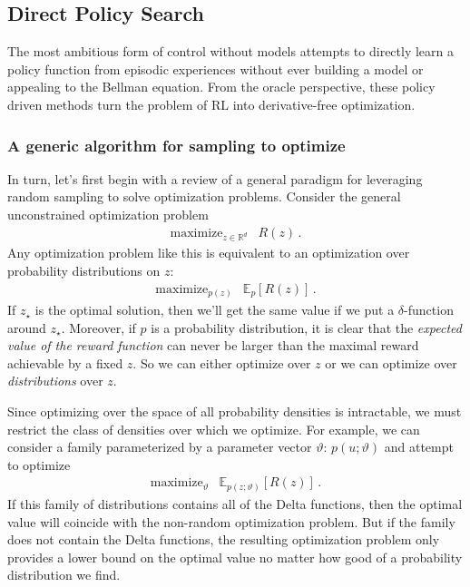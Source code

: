 \documentclass[11pt]{article}
\numberwithin{equation}{section}
\newcommand{\R}{\mathbb{R}}
\begin{document}
\subsection{Direct Policy Search}\label{sec:policy-search}

The most ambitious form of control without models attempts to directly learn a policy function from episodic experiences without ever building a model or appealing to the Bellman equation. From the oracle perspective, these policy driven methods turn the problem of RL into derivative-free optimization.

\subsubsection{A generic algorithm for sampling to optimize}

In turn, let's first begin with a review of a general paradigm for leveraging random sampling to solve optimization problems. Consider the general unconstrained optimization problem
\begin{equation}\label{eq:generic-reward-opt}
\begin{array}{ll}
	\mbox{maximize}_{z\in\R^d} & R(z) \,.
	\end{array}
\end{equation}
Any optimization problem like this is equivalent to an optimization over probability distributions on $z$:
$$
\begin{array}{ll}
	\mbox{maximize}_{p(z)} & \mathbb{E}_p[R(z)] \,.
\end{array}
$$
If $z_\star$ is the optimal solution, then we'll get the same value if we put a $\delta$-function around $z_\star$.  Moreover, if $p$ is a probability distribution, it is clear that the \emph{expected value of the reward function} can never be larger than the maximal reward achievable by a fixed $z$. So we can either optimize over $z$ or we can optimize over \emph{distributions} over $z$.

Since optimizing over the space of all probability densities is intractable, we must restrict the class of densities over which we optimize. For example, we can consider a family parameterized by a parameter vector $\vartheta$: $p(u;\vartheta)$ and attempt to optimize
\begin{equation}\label{eq:stoch-search}
\begin{array}{ll}
	\mbox{maximize}_{\vartheta} & \mathbb{E}_{p(z;\vartheta)}[R(z)] \,.
\end{array}
\end{equation}
If this family of distributions contains all of the Delta functions, then the optimal value will coincide with the non-random optimization problem. But if the family does not contain the Delta functions, the resulting optimization problem only provides a lower bound on the optimal value no matter how good of a probability distribution we find. 
\end{document}
